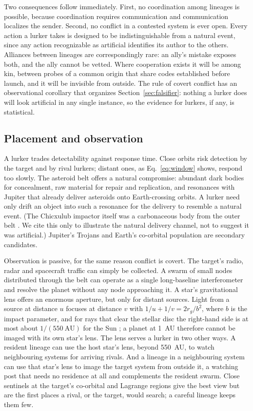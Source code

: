 \documentclass[preprint,12pt]{elsarticle}
\theoremstyle{definition}
\begin{document}
Two consequences follow immediately. First, no coordination among lineages is possible, because coordination requires communication and communication localizes the sender. Second, no conflict in a contested system is ever open. Every action a lurker takes is designed to be indistinguishable from a natural event, since any action recognizable as artificial identifies its author to the others. Alliances between lineages are correspondingly rare: an ally's mistake exposes both, and the ally cannot be vetted. Where cooperation exists it will be among kin, between probes of a common origin that share codes established before launch, and it will be invisible from outside. The rule of covert conflict has an observational corollary that organizes Section~\ref{sec:falsifier}: nothing a lurker does will look artificial in any single instance, so the evidence for lurkers, if any, is statistical.

\subsection{Placement and observation}
\label{sec:placement}

A lurker trades detectability against response time. Close orbits risk detection by the target and by rival lurkers; distant ones, as Eq.~\eqref{eq:window} shows, respond too slowly. The asteroid belt offers a natural compromise: abundant dark bodies for concealment, raw material for repair and replication, and resonances with Jupiter that already deliver asteroids onto Earth-crossing orbits. A lurker need only drift an object into such a resonance for the delivery to resemble a natural event. (The Chicxulub impactor itself was a carbonaceous body from the outer belt \citep{FischerGodde2024}. We cite this only to illustrate the natural delivery channel, not to suggest it was artificial.) Jupiter's Trojans and Earth's co-orbital population \citep{Benford2019} are secondary candidates.

Observation is passive, for the same reason conflict is covert. The target's radio, radar and spacecraft traffic can simply be collected. A swarm of small nodes distributed through the belt can operate as a single long-baseline interferometer and resolve the planet without any node approaching it. A star's gravitational lens offers an enormous aperture, but only for distant sources. Light from a source at distance $u$ focuses at distance $v$ with $1/u + 1/v = 2 r_g/b^{2}$, where $b$ is the impact parameter, and for rays that clear the stellar disc the right-hand side is at most about $1/(550~\mathrm{AU})$ for the Sun \citep{Eshleman1979,TuryshevToth2017}; a planet at 1~AU therefore cannot be imaged with its own star's lens. The lens serves a lurker in two other ways. A resident lineage can use the host star's lens, beyond 550~AU, to watch neighbouring systems for arriving rivals. And a lineage in a neighbouring system can use that star's lens to image the target system from outside it, a watching post that needs no residence at all and complements the resident swarm. Close sentinels at the target's co-orbital and Lagrange regions give the best view but are the first places a rival, or the target, would search; a careful lineage keeps them few.
\end{document}
